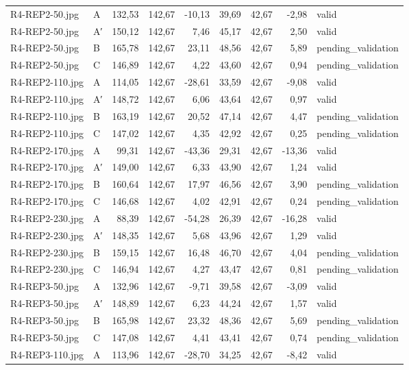 \begin{scriptsize}
\begin{longtable}{@{}llrrrrrrl@{}}
R4-REP2-50.jpg & A & 132,53 & 142,67 & -10,13 & 39,69 & 42,67 & -2,98 & valid \\
R4-REP2-50.jpg & A′ & 150,12 & 142,67 & 7,46 & 45,17 & 42,67 & 2,50 & valid \\
R4-REP2-50.jpg & B & 165,78 & 142,67 & 23,11 & 48,56 & 42,67 & 5,89 & pending\_validation \\
R4-REP2-50.jpg & C & 146,89 & 142,67 & 4,22 & 43,60 & 42,67 & 0,94 & pending\_validation \\
R4-REP2-110.jpg & A & 114,05 & 142,67 & -28,61 & 33,59 & 42,67 & -9,08 & valid \\
R4-REP2-110.jpg & A′ & 148,72 & 142,67 & 6,06 & 43,64 & 42,67 & 0,97 & valid \\
R4-REP2-110.jpg & B & 163,19 & 142,67 & 20,52 & 47,14 & 42,67 & 4,47 & pending\_validation \\
R4-REP2-110.jpg & C & 147,02 & 142,67 & 4,35 & 42,92 & 42,67 & 0,25 & pending\_validation \\
R4-REP2-170.jpg & A & 99,31 & 142,67 & -43,36 & 29,31 & 42,67 & -13,36 & valid \\
R4-REP2-170.jpg & A′ & 149,00 & 142,67 & 6,33 & 43,90 & 42,67 & 1,24 & valid \\
R4-REP2-170.jpg & B & 160,64 & 142,67 & 17,97 & 46,56 & 42,67 & 3,90 & pending\_validation \\
R4-REP2-170.jpg & C & 146,68 & 142,67 & 4,02 & 42,91 & 42,67 & 0,24 & pending\_validation \\
R4-REP2-230.jpg & A & 88,39 & 142,67 & -54,28 & 26,39 & 42,67 & -16,28 & valid \\
R4-REP2-230.jpg & A′ & 148,35 & 142,67 & 5,68 & 43,96 & 42,67 & 1,29 & valid \\
R4-REP2-230.jpg & B & 159,15 & 142,67 & 16,48 & 46,70 & 42,67 & 4,04 & pending\_validation \\
R4-REP2-230.jpg & C & 146,94 & 142,67 & 4,27 & 43,47 & 42,67 & 0,81 & pending\_validation \\
R4-REP3-50.jpg & A & 132,96 & 142,67 & -9,71 & 39,58 & 42,67 & -3,09 & valid \\
R4-REP3-50.jpg & A′ & 148,89 & 142,67 & 6,23 & 44,24 & 42,67 & 1,57 & valid \\
R4-REP3-50.jpg & B & 165,98 & 142,67 & 23,32 & 48,36 & 42,67 & 5,69 & pending\_validation \\
R4-REP3-50.jpg & C & 147,08 & 142,67 & 4,41 & 43,41 & 42,67 & 0,74 & pending\_validation \\
R4-REP3-110.jpg & A & 113,96 & 142,67 & -28,70 & 34,25 & 42,67 & -8,42 & valid \\

\end{longtable}
\end{scriptsize}
